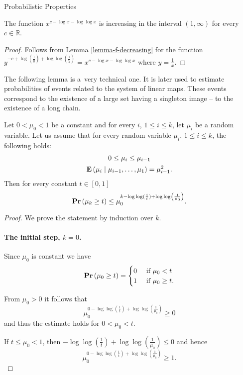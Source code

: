 \begin{section}{Probabilistic Properties}
\begin{corollary}
\label{corollary-f1}
The function $x ^ {c - \log x - \log \log x}$ is increasing in the interval $(1, \infty)$ for every $c \in \mathbb{R}$.
\end{corollary}
\begin{proof}
Follows from Lemma \ref{lemma-f-decreasing} for the function $y ^ {-c + \log \left(\frac{1}{y}\right) + \log \log \left(\frac{1}{y}\right)} = x ^ {c - \log x - \log \log x}$ where $y = \frac{1}{x}$. 
\end{proof}

The following lemma is a~very technical one. It is later used to estimate probabilities of events related to the system of linear maps. These events correspond to the existence of a large set having a singleton image -- to the existence of a long chain.
\begin{lemma}
\label{lemma-random-variable}
Let $0 < \mu_0 < 1$ be a constant and for every $i$, $1 \leq i \leq k$, let $\mu_i$ be a random variable. Let us assume that for every random variable $\mu_i$, $1 \leq i \leq k$, the following holds:
\begin{gather*}
0 \leq \mu_i \leq \mu_{i - 1} \\
\mathbf{E}\left( \mu_i \mid \mu_{i-1}, \dots, \mu_1 \right) = \mu_{i-1}^{2} \text{.}
\end{gather*}
Then for every constant $t \in \left[0, 1 \right]$ \[ \mathbf{Pr}\left(\mu_k \geq t\right) \leq \mu_0^{k - \log \log (\frac{1}{t}) + \log \log \left(\frac{1}{\mu_0}\right)} \text{.} \]
\end{lemma}
\begin{proof}
We prove the statement by induction over $k$. 

\paragraph*{The initial step, $k = 0$.}
Since $\mu_0$ is constant we have
\[
	\mathbf{Pr}\left(\mu_0 \geq t\right) = \begin{cases}
		0 & \text{ if } \mu_0 < t \\
		1 & \text{ if } \mu_0 \geq t \text{.} \\
	\end{cases}
\]

From $\mu_0 > 0$ it follows that
\[
	\mu_0^{0 - \log \log \left(\frac{1}{t}\right) + \log \log \left(\frac{1}{\mu_0}\right)} \geq 0
\]
and thus the estimate holds for $0 < \mu_0 < t$.

If $t \leq \mu_0 < 1$, then $-\log \log \left(\frac{1}{t}\right) + \log \log \left(\frac{1}{\mu_0}\right) \leq 0$ and hence
\[
	\mu_0^{0 - \log \log \left(\frac{1}{t}\right) + \log \log \left(\frac{1}{\mu_0}\right)} \geq 1 \text{.}
\]


\end{proof}
\end{section}
